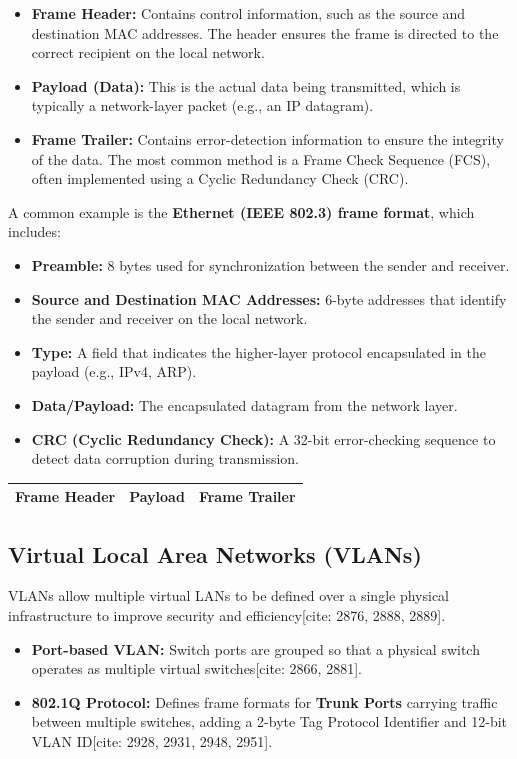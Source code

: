 \documentclass[12pt,a4paper]{article}
\begin{document}
\begin{itemize}
    \item \textbf{Frame Header:} Contains control information, such as the source and destination MAC addresses. The header ensures the frame is directed to the correct recipient on the local network.
    \item \textbf{Payload (Data):} This is the actual data being transmitted, which is typically a network-layer packet (e.g., an IP datagram).
    \item \textbf{Frame Trailer:} Contains error-detection information to ensure the integrity of the data. The most common method is a Frame Check Sequence (FCS), often implemented using a Cyclic Redundancy Check (CRC).
\end{itemize}

A common example is the \textbf{Ethernet (IEEE 802.3) frame format}, which includes:
\begin{itemize}
    \item \textbf{Preamble:} 8 bytes used for synchronization between the sender and receiver.
    \item \textbf{Source and Destination MAC Addresses:} 6-byte addresses that identify the sender and receiver on the local network.
    \item \textbf{Type:} A field that indicates the higher-layer protocol encapsulated in the payload (e.g., IPv4, ARP).
    \item \textbf{Data/Payload:} The encapsulated datagram from the network layer.
    \item \textbf{CRC (Cyclic Redundancy Check):} A 32-bit error-checking sequence to detect data corruption during transmission.
\end{itemize}

\vspace{0.3em}
\centering
\begin{tabular}{|c|c|c|}
    \hline
    \textbf{Frame Header} & \textbf{Payload} & \textbf{Frame Trailer} \\
    \hline
\end{tabular}

\subsection*{Virtual Local Area Networks (VLANs)}
VLANs allow multiple virtual LANs to be defined over a single physical infrastructure to improve security and efficiency[cite: 2876, 2888, 2889].
\begin{itemize}
    \item \textbf{Port-based VLAN:} Switch ports are grouped so that a physical switch operates as multiple virtual switches[cite: 2866, 2881].
    \item \textbf{802.1Q Protocol:} Defines frame formats for \textbf{Trunk Ports} carrying traffic between multiple switches, adding a 2-byte Tag Protocol Identifier and 12-bit VLAN ID[cite: 2928, 2931, 2948, 2951].
\end{itemize}
\end{document}

